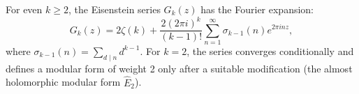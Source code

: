 For even $k \geq 2$, the Eisenstein series $G_k(z)$ has the Fourier expansion:
$$
G_k(z) = 2\zeta(k) + \frac{2(2\pi i)^k}{(k-1)!} \sum_{n=1}^\infty \sigma_{k-1}(n) e^{2\pi i n z},
$$
where $\sigma_{k-1}(n) = \sum_{d \mid n} d^{k-1}$. For $k=2$, the series converges conditionally and defines a modular form of weight 2 only after a suitable modification (the almost holomorphic modular form $\hat{E}_2$).
